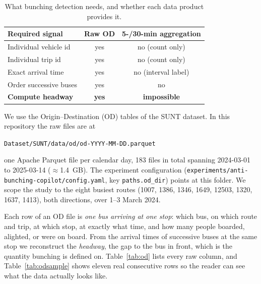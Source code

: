 \documentclass[11pt,a4paper]{article}
\begin{document}
\begin{table}[t]
\centering
\caption{What bunching detection needs, and whether each data product provides it.}
\label{tab:schema}
\begin{tabular}{lcc}
\toprule
Required signal & Raw OD & 5-/30-min aggregation \\
\midrule
Individual vehicle id        & yes & no (count only) \\
Individual trip id           & yes & no (count only) \\
Exact arrival time           & yes & no (interval label) \\
Order successive buses       & yes & no \\
\textbf{Compute headway}     & \textbf{yes} & \textbf{impossible} \\
\bottomrule
\end{tabular}
\end{table}

We use the Origin--Destination (OD) tables of the SUNT dataset. In this repository the raw files are
at
\begin{center}
\texttt{Dataset/SUNT/data/od/od-YYYY-MM-DD.parquet}
\end{center}
one Apache Parquet file per calendar day, 183 files in total spanning 2024-03-01 to 2025-03-14
($\approx$1.4~GB). The experiment configuration
(\texttt{experiments/anti-bunching-copilot/config.yaml}, key \texttt{paths.od\_dir}) points at this
folder. We scope the study to the eight busiest routes (1007, 1386, 1346, 1649, 12503, 1320, 1637,
1413), both directions, over 1--3 March 2024.

Each row of an OD file is \emph{one bus arriving at one stop}: which bus, on which route and trip, at
which stop, at exactly what time, and how many people boarded, alighted, or were on board. From the
arrival times of successive buses at the same stop we reconstruct the \emph{headway}, the gap to the
bus in front, which is the quantity bunching is defined on. Table~\ref{tab:od} lists every raw
column, and Table~\ref{tab:odsample} shows eleven real consecutive rows so the reader can see what
the data actually looks like.
\end{document}
